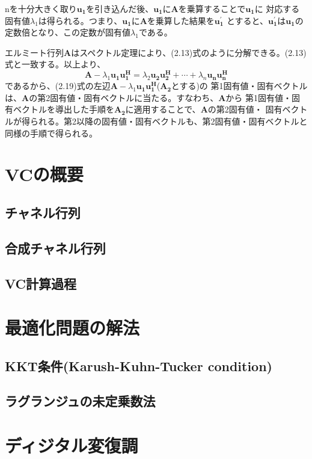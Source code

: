 nを十分大きく取り$\bm{u_1}$を引き込んだ後、$\bm{u_1}$に$\bm{A}$を乗算することで$\bm{u_1}$に
対応する固有値$\lambda_1$は得られる。つまり、$\bm{u_1}$に$\bm{A}$を乗算した結果を$\bm{u_1^{\prime}}$
とすると、$\bm{u_1^{\prime}}$は$\bm{u_1}$の定数倍となり、この定数が固有値$\lambda_1$である。

エルミート行列$\bm{A}$はスペクトル定理により、(2.13)式のように分解できる。(2.13)式と一致する。以上より、
\begin{equation}
    \bm{A} - \lambda_1\bm{u_1}\bm{u_1^H} = \lambda_2\bm{u_2}\bm{u_2^H} + \cdots + \lambda_n\bm{u_n}\bm{u_n^H}
\end{equation}
であるから、(2.19)式の左辺$\bm{A} - \lambda_1\bm{u_1}\bm{u_1^H}$($\bm{A_2}$とする)の
第1固有値・固有ベクトルは、$\bm{A}$の第2固有値・固有ベクトルに当たる。すなわち、$\bm{A}$から
第1固有値・固有ベクトルを導出した手順を$\bm{A_2}$に適用することで、$\bm{A}$の第2固有値・
固有ベクトルが得られる。第2以降の固有値・固有ベクトルも、第2固有値・固有ベクトルと同様の手順で得られる。

\section{VCの概要}
\subsection{チャネル行列}
\subsection{合成チャネル行列}
\subsection{VC計算過程}

\section{最適化問題の解法}
\subsection{KKT条件(Karush-Kuhn-Tucker condition)}
\subsection{ラグランジュの未定乗数法}

\section{ディジタル変復調}
